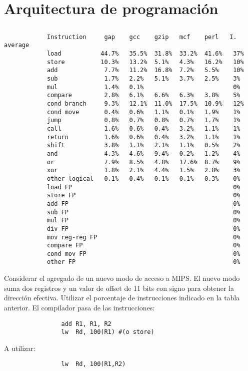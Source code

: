 \section{Arquitectura de programación}

\subsection{}
	  \begin{small}
			\begin{verbatim}                                   
			Instruction     gap    gcc    gzip   mcf    perl   I. average
			load           44.7%   35.5%  31.8%  33.2%  41.6%   37%
			store          10.3%   13.2%  5.1%   4.3%   16.2%   10%
			add             7.7%   11.2%  16.8%  7.2%   5.5%    10%
			sub             1.7%   2.2%   5.1%   3.7%   2.5%    3%
			mul             1.4%   0.1%                         0%
			compare         2.8%   6.1%   6.6%   6.3%   3.8%    5%
			cond branch     9.3%   12.1%  11.0%  17.5%  10.9%   12%
			cond move       0.4%   0.6%   1.1%   0.1%   1.9%    1%
			jump            0.8%   0.7%   0.8%   0.7%   1.7%    1%
			call            1.6%   0.6%   0.4%   3.2%   1.1%    1%
			return          1.6%   0.6%   0.4%   3.2%   1.1%    1%
			shift           3.8%   1.1%   2.1%   1.1%   0.5%    2%
			and             4.3%   4.6%   9.4%   0.2%   1.2%    4%
			or              7.9%   8.5%   4.8%   17.6%  8.7%    9%
			xor             1.8%   2.1%   4.4%   1.5%   2.8%    3%
			other logical   0.1%   0.4%   0.1%   0.1%   0.3%    0%
			load FP                                             0%
			store FP                                            0%
			add FP                                              0%
			sub FP                                              0%
			mul FP                                              0%
			div FP                                              0%
			mov reg-reg FP                                      0%
			compare FP                                          0%
			cond mov FP                                         0%
			other FP                                            0%
			\end{verbatim}
			\end{small}
		
			Considerar el agregado de un nuevo modo de acceso a MIPS.
			El nuevo modo suma dos registros y un valor de offset de 11 bits con signo para obtener
			la dirección efectiva. Utilizar el porcentaje de instrucciones indicado en la tabla anterior.
			\vspace{3mm}
			El compilador pasa de las instrucciones: 
			\begin{verbatim}
			    add R1, R1, R2
			    lw  Rd, 100(R1) #(o store)
			\end{verbatim}
			\vspace{1.5mm}
			A utilizar:
			\begin{verbatim}
			    lw	Rd, 100(R1,R2)
			\end{verbatim}
			
